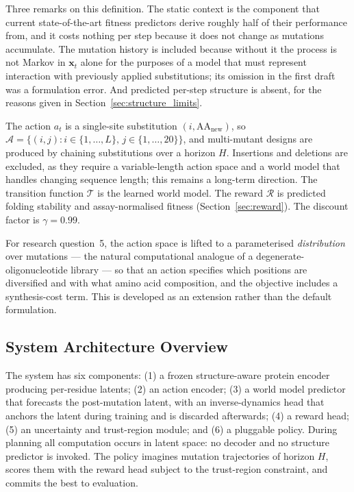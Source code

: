 \documentclass[12pt, a4paper]{article}
\begin{document}
Three remarks on this definition. The static context is the component that current state-of-the-art fitness predictors derive roughly half of their performance from, and it costs nothing per step because it does not change as mutations accumulate. The mutation history is included because without it the process is not Markov in $\mathbf{x}_t$ alone for the purposes of a model that must represent interaction with previously applied substitutions; its omission in the first draft was a formulation error. And predicted per-step structure is absent, for the reasons given in Section~\ref{sec:structure_limits}.

The action $a_t$ is a single-site substitution $(i, \mathrm{AA}_{\text{new}})$, so $\mathcal{A} = \{(i,j) : i \in \{1,\ldots,L\},\, j \in \{1,\ldots,20\}\}$, and multi-mutant designs are produced by chaining substitutions over a horizon $H$. Insertions and deletions are excluded, as they require a variable-length action space and a world model that handles changing sequence length; this remains a long-term direction. The transition function $\mathcal{T}$ is the learned world model. The reward $\mathcal{R}$ is predicted folding stability and assay-normalised fitness (Section~\ref{sec:reward}). The discount factor is $\gamma = 0.99$.

For research question~5, the action space is lifted to a parameterised \textit{distribution} over mutations --- the natural computational analogue of a degenerate-oligonucleotide library --- so that an action specifies which positions are diversified and with what amino acid composition, and the objective includes a synthesis-cost term. This is developed as an extension rather than the default formulation.

\subsection{System Architecture Overview}

The system has six components: (1) a frozen structure-aware protein encoder producing per-residue latents; (2) an action encoder; (3) a world model predictor that forecasts the post-mutation latent, with an inverse-dynamics head that anchors the latent during training and is discarded afterwards; (4) a reward head; (5) an uncertainty and trust-region module; and (6) a pluggable policy. During planning all computation occurs in latent space: no decoder and no structure predictor is invoked. The policy imagines mutation trajectories of horizon $H$, scores them with the reward head subject to the trust-region constraint, and commits the best to evaluation.
\end{document}
